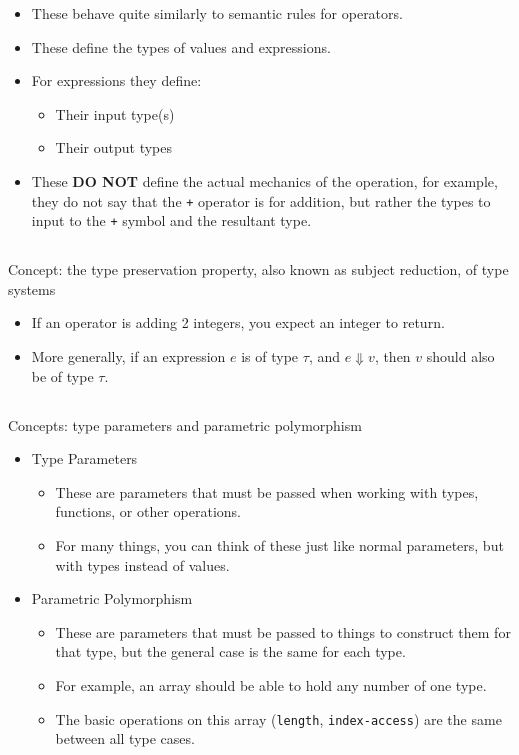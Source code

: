 \begin{itemize}[noitemsep]
\item These behave quite similarly to semantic rules for operators.
\item These define the types of values and expressions.
\item For expressions they define:
  \begin{itemize}[noitemsep]
  \item Their input type(s)
  \item Their output types
  \end{itemize}
\item These \textbf{DO NOT} define the actual mechanics of the operation, for example, they do not say that the \texttt{+} operator is for addition, but rather the types to input to the \texttt{+} symbol and the resultant type.
\end{itemize}

\subsection{}
Concept: the type preservation property, also known as subject reduction, of type systems

\begin{itemize}[noitemsep]
\item If an operator is adding 2 integers, you expect an integer to return.
\item More generally, if an expression $e$ is of type $\tau$, and $e \Downarrow v$, then $v$ should also be of type $\tau$.
\end{itemize}

\subsection{}
Concepts: type parameters and parametric polymorphism

\begin{itemize}
\item Type Parameters
  \begin{itemize}[noitemsep]
  \item These are parameters that must be passed when working with types, functions, or other operations.
  \item For many things, you can think of these just like normal parameters, but with types instead of values. 
  \end{itemize}

\item Parametric Polymorphism
  \begin{itemize}[noitemsep]
  \item These are parameters that must be passed to things to construct them for that type, but the general case is the same for each type.
  \item For example, an array should be able to hold any number of one type.
  \item The basic operations on this array (\texttt{length}, \texttt{index-access}) are the same between all type cases.
  \end{itemize}
\end{itemize}

